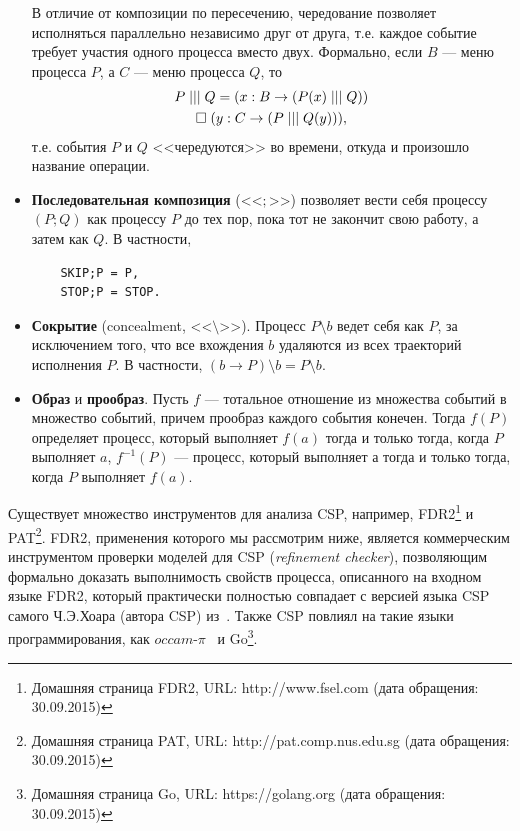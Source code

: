 \documentclass[a4, 14pt]{article}
\begin{document}
\begin{itemize}
    В отличие от композиции по пересечению, чередование позволяет исполняться 
    параллельно независимо друг от друга, т.е. каждое событие требует участия 
    одного процесса вместо двух. Формально, если $B$ --- меню процесса $P$, а $C$
    --- меню процесса $Q$, то
    \begin{multline}
      $$P\;|||\;Q=(x:B\rightarrow(P(x)\;|||\;Q))\\
        \Box\;(y:C\rightarrow(P\;|||\;Q(y))),$$
    \end{multline}
    т.е. события $P$ и $Q$ <<чередуются>> во времени, откуда и произошло 
    название операции.
  \item \textbf{Последовательная композиция} (<<$;$>>) позволяет вести себя процессу 
    $(P;Q)$ как процессу $P$ до тех пор, пока тот не закончит свою работу, а 
    затем как $Q$. В частности, 
    \begin{verbatim}
    SKIP;P = P, 
    STOP;P = STOP.\end{verbatim}
  \item \textbf{Сокрытие} (concealment, <<$\setminus$>>). Процесс $P\setminus{b}$ ведет себя как $P$, 
    за исключением того, что все вхождения $b$ удаляются из всех траекторий 
    исполнения $P$. В частности, $(b\rightarrow{P}) \setminus b = P \setminus b$.
  \item \textbf{Образ} и \textbf{прообраз}. Пусть $f$ --- тотальное отношение из множества событий 
    в множество событий, причем прообраз каждого события конечен. Тогда $f(P)$ 
    определяет процесс, который выполняет $f(a)$ тогда и только тогда, когда $P$ 
    выполняет $a$, $f^{-1}(P)$ --- процесс, который выполняет а тогда и только 
    тогда, когда $P$ выполняет $f(a)$.
\end{itemize}

Существует множество инструментов для анализа CSP, например, 
FDR2\footnote{Домашняя страница FDR2, URL: http://www.fsel.com (дата обращения: 30.09.2015)} и
PAT\footnote{Домашняя страница PAT, URL: http://pat.comp.nus.edu.sg (дата обращения: 30.09.2015)}. 
FDR2, применения которого мы рассмотрим 
ниже, является коммерческим инструментом проверки моделей для CSP 
(\textit{refinement checker}), позволяющим формально доказать выполнимость свойств 
процесса, описанного на входном языке FDR2, который практически полностью 
совпадает с версией языка CSP самого Ч.Э.Хоара (автора CSP) из~\cite{hoare1985csp}. 
Также CSP повлиял на такие языки программирования, как $occam\mbox{-}\pi$~\cite{welch2005communicating} и 
Go\footnote{Домашняя страница Go, URL: https://golang.org (дата обращения: 30.09.2015)}.
\end{document}
